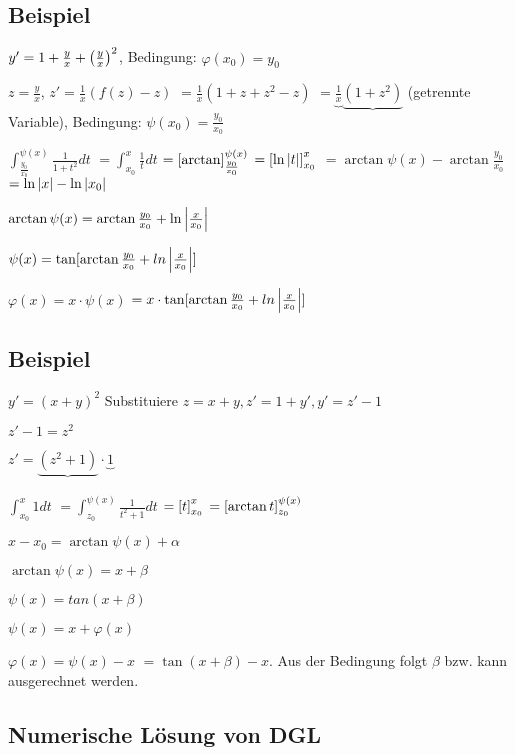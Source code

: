 \subsection{Beispiel}
$y' = 1 + \frac{y}{x} +  \left( \frac{y}{x} \right) ^2$, Bedingung: $\varphi(x_0) = y_0$

$z=\frac{y}{x}$, 
$z' = \frac{1}{x} (f(z)-z)$
$= \frac{1}{x} (1+z+z^2-z)$
$= \underbrace{\frac{1}{x}} \underbrace{(1+z^2)}$ (getrennte Variable), Bedingung: 
$\psi(x_0) = \frac{y_0}{x_0}$

$\int_{\frac{y_0}{x_0}}^{\psi(x)} \frac{1}{1+t^2} dt $
$=\int_{x_0}^{x} \frac{1}{t} dt $
$=  \left[ \arctan \right] _{\frac{y_0}{x_0}}^{\psi(x)}$
$= \left[ \ln  \left\vert t \right\vert  \right] _{x_0}^x$
$=\arctan \psi(x) - \arctan \frac{y_0}{x_0}$
$=\ln  \left\vert x \right\vert  - \ln  \left\vert x_0 \right\vert $

$\arctan \psi(x) = \arctan \frac{y_0}{x_0} + \ln  \left\vert \frac{x}{x_0} \right\vert $

$\psi(x) = \tan [\arctan \frac{y_0}{x_0} + ln  \left\vert \frac{x}{x_0} \right\vert ]$

$\varphi(x) = x\cdot \psi(x) $
$=x\cdot \tan [\arctan \frac{y_0}{x_0} + ln  \left\vert \frac{x}{x_0} \right\vert ]$

\subsection{Beispiel}
$y' = (x+y)^2$ Substituiere $z=x+y, z'=1+y', y'=z'-1$

$z'-1 = z^2$

$z' = \underbrace{(z^2+1)}_{} \cdot \underbrace{1}_{} $ 

$\int_{x_0}^{x} 1 dt $
$=\int_{z_0}^{\psi(x)} \frac{1}{t^2+1} dt $
$= \left[ t \right] _{x_0}^x $
$= \left[ \arctan t \right] _{z_0}^{\psi(x)} $

$x-x_0=\arctan \psi(x) + \alpha$

$\arctan \psi(x) = x+\beta$

$\psi(x) = tan(x+\beta)$

$\psi(x) = x + \varphi(x)$

$\varphi(x) = \psi(x) - x$
\underline{$=\tan(x+\beta) - x$}. Aus der Bedingung folgt $\beta$ bzw. kann ausgerechnet werden. 

\subsection{Numerische Lösung von DGL}

